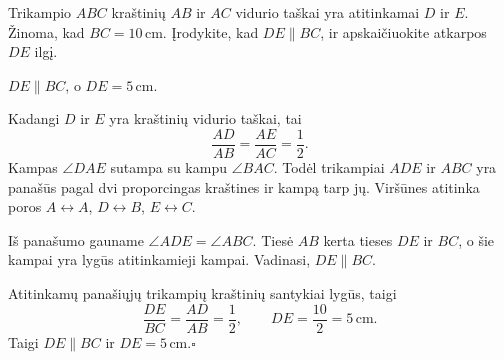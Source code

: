 \begin{salyga}
Trikampio $ABC$ kraštinių $AB$ ir $AC$ vidurio taškai yra atitinkamai
$D$ ir $E$. Žinoma, kad $BC=10\,\text{cm}$.
Įrodykite, kad $DE\parallel BC$, ir apskaičiuokite atkarpos $DE$ ilgį.
\end{salyga}

\begin{atsakymas}
$DE\parallel BC$, o $DE=5\,\text{cm}$.
\end{atsakymas}

\begin{sprendimas}
Kadangi $D$ ir $E$ yra kraštinių vidurio taškai, tai
\[
  \frac{AD}{AB}=\frac{AE}{AC}=\frac12.
\]
Kampas $\angle DAE$ sutampa su kampu $\angle BAC$.
Todėl trikampiai $ADE$ ir $ABC$ yra panašūs pagal dvi proporcingas
kraštines ir kampą tarp jų. Viršūnes atitinka poros
$A\leftrightarrow A$, $D\leftrightarrow B$, $E\leftrightarrow C$.

Iš panašumo gauname $\angle ADE=\angle ABC$. Tiesė $AB$ kerta
tieses $DE$ ir $BC$, o šie kampai yra lygūs atitinkamieji kampai.
Vadinasi, $DE\parallel BC$.

Atitinkamų panašiųjų trikampių kraštinių santykiai lygūs, taigi
\[
  \frac{DE}{BC}=\frac{AD}{AB}=\frac12,
  \qquad DE=\frac{10}{2}=5\,\text{cm}.
\]
Taigi $DE\parallel BC$ ir $DE=5\,\text{cm}$.\hfill$\square$
\end{sprendimas}
